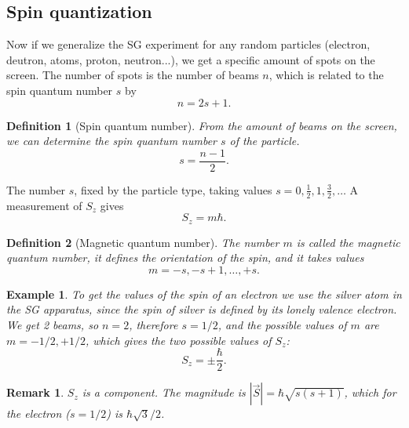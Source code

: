 \documentclass{article}
\newtheorem{definition}{Definition}
\newtheorem*{example}{Example}
\newtheorem{remark}{Remark}
\begin{document}
\subsection{Spin quantization}
Now if we generalize the SG experiment for any random particles (electron, deutron, atoms, proton, neutron...), we get a specific amount of spots on the screen. The number of spots is the number of beams $n$, which is related to the spin quantum number $s$ by
\begin{equation}
    \label{eq:spin-quantization}
    n=2s+1.
\end{equation}
\begin{definition}[Spin quantum number]
    From the amount of beams on the screen, we can determine the spin quantum number $s$ of the particle.
    \[s = \frac{n-1}{2}.\]
\end{definition}
The number $s$, fixed by the particle type, taking values $s = 0, \tfrac12, 1, \tfrac32, \dots$ A measurement of $S_z$ gives
\[S_z = m\hbar.\]
\begin{definition}[Magnetic quantum number]
    The number $m$ is called the magnetic quantum number, it defines the orientation of the spin, and it takes values
    \[m = -s, -s+1, \dots, +s.\]
\end{definition}
\begin{example}
    To get the values of the spin of an electron we use the silver atom in the SG apparatus, since the spin of silver is defined by its lonely valence electron. We get 2 beams, so $n=2$, therefore $s=1/2$, and the possible values of $m$ are $m = -1/2, +1/2$, which gives the two possible values of $S_z$:
    \[S_z = \pm\frac{\hbar}{2}.\]
\end{example}
\begin{remark}
    $S_z$ is a component. The magnitude is $|\vec{S}| = \hbar\sqrt{s(s+1)}$, which for the electron ($s=1/2$) is $\hbar\sqrt{3}/2$.
\end{remark}
\end{document}
